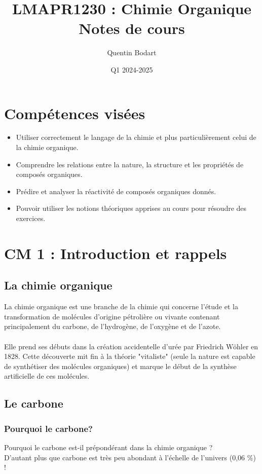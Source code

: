\documentclass{article}
\title{LMAPR1230 : Chimie Organique\\Notes de cours}
\author{Quentin Bodart}
\date{Q1 2024-2025}
\begin{document}
\maketitle
\tableofcontents
\pagebreak

\section*{Compétences visées}
    \begin{itemize}
        \item Utiliser correctement le langage de la chimie et plus
        particulièrement celui de la chimie organique.
        \item Comprendre les relations entre la nature, la
        structure et les propriétés de composés organiques.
        \item Prédire et analyser la réactivité de composés
        organiques donnés.
        \item Pouvoir utiliser les notions théoriques apprises au
        cours pour résoudre des exercices.
    \end{itemize}

\section{CM 1 : Introduction et rappels}
    \subsection{La chimie organique}
        La chimie organique est une branche de la chimie qui concerne
        l’étude et la transformation de molécules d’origine pétrolière ou
        vivante contenant principalement
        du carbone, de l’hydrogène, de l’oxygène et de l’azote.\\\\
        Elle prend ses débuts dans la création accidentelle d'urée par Friedrich Wöhler en 1828.
        Cette découverte mit fin à la théorie "vitaliste" (seule la nature est capable de synthétiser des molécules organiques) 
        et marque le début de la synthèse artificielle de ces molécules.

    \subsection{Le carbone}
        \subsubsection{Pourquoi le carbone?}
            Pourquoi le carbone est-il prépondérant dans la chimie organique ? \\
            D'autant plus que carbone est très peu abondant à l'échelle de l'univers (0,06 \%) !
\end{document}
